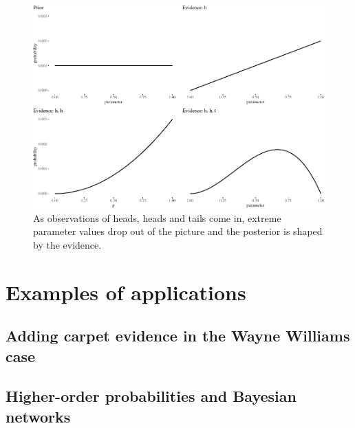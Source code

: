 \documentclass[
  10pt,
  dvipsnames,enabledeprecatedfontcommands]{scrartcl}
\begin{document}
\begin{figure}[H]

\begin{center}\includegraphics[width=1\linewidth]{chapter-outline_files/figure-latex/fig:inertia3-1} \end{center}
\caption{As observations of heads, heads and tails come in, extreme parameter values drop out of the picture and the posterior is shaped by the evidence.}
\label{fig:intertia2}
\end{figure}

\hypertarget{examples-of-applications}{%
\section{Examples of applications}\label{examples-of-applications}}

\hypertarget{adding-carpet-evidence-in-the-wayne-williams-case}{%
\subsection{Adding carpet evidence in the Wayne Williams
case}\label{adding-carpet-evidence-in-the-wayne-williams-case}}

\hypertarget{higher-order-probabilities-and-bayesian-networks}{%
\subsection{Higher-order probabilities and Bayesian
networks}\label{higher-order-probabilities-and-bayesian-networks}}
\end{document}
